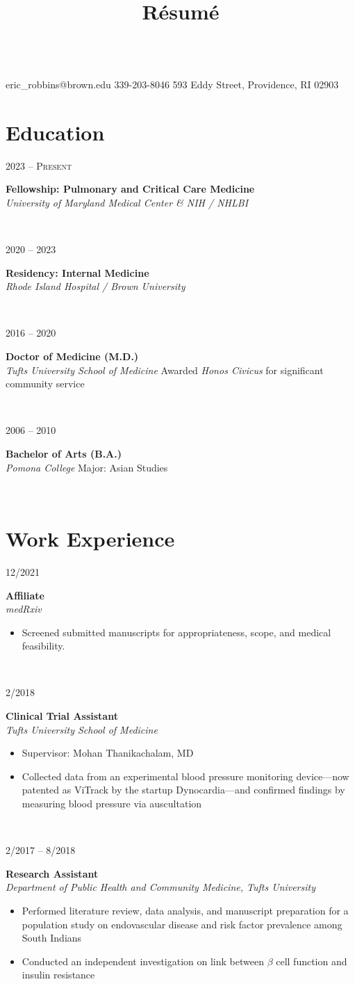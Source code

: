 \documentclass{book}
\title{R\'esum\'e}
\author{\me}
\date{}
\makeatletter
\newcommand\colleft{.20}
\newcommand\colright{.75}
\newcommand\mohan{Mohan Thanikachalam, MD}
\newcommand{\entryfour}[4]
	{
		\begin{minipage}[t]{\colleft\textwidth}
		\hfill \textsc{#1}
		\end{minipage}
		\hfill\vline\hfill
		\begin{minipage}[t]{\colright\textwidth}
		{\bf#2}\\
		\textit{#3}
		\footnotesize{#4}
		\end{minipage}\\
		\entryvspace
	}%
\newcommand{\entryvspace}{\vspace{0.5em}}
\newcommand{\fellowship}{University of Maryland Medical Center \& NIH / NHLBI}
\newcommand{\residency}{Rhode Island Hospital / Brown University}
\newcommand{\medschool}{Tufts University School of Medicine}
\newcommand{\undergrad}{Pomona College}
\newcommand{\cphone}{339-203-8046}
\newcommand{\address}{593 Eddy Street, Providence, RI 02903}
\newcommand{\email}{eric\_robbins@brown.edu}
\renewcommand{\maketitle}{
\begin{center}
	{\huge\bfseries\theauthor}
	\vspace{0.25em}\\
	\email
	\hspace{1em}\vline \hspace{1em}%
	\cphone
	\hspace{1em}\vline \hspace{1em}
	\address
\end{center}
}
\makeatother
\begin{document}
	\maketitle
	\section*{Education}
		\entryfour{2023 -- Present}
			{Fellowship: Pulmonary and Critical Care Medicine}
			{\fellowship}
			{}
			
		\entryfour{2020 -- 2023}
			{Residency: Internal Medicine}
			{\residency}
			{}
			
		\entryfour{2016 -- 2020}
			{Doctor of Medicine (M.D.)}
			{\medschool}
			{Awarded \textit{Honos Civicus} for significant community service}
			
		\entryfour{2006 -- 2010}
		{Bachelor of Arts (B.A.)}
		{\undergrad}
		{Major: Asian Studies}
	\section*{Work Experience}
		\entryfour{12/2021}{Affiliate}{medRxiv}{%
			\begin{itemize}
				\item Screened submitted manuscripts for appropriateness, scope, and medical feasibility.
			\end{itemize}
			}

		\entryfour{2/2018}{Clinical Trial Assistant}{\medschool}{%
		 \begin{itemize}
		 	\item Supervisor: \mohan
		 	\item Collected data from an experimental blood pressure monitoring device—now patented as ViTrack by the startup Dynocardia—and confirmed findings by measuring blood pressure via auscultation
		 \end{itemize}
	 	}
		
		\entryfour{2/2017 -- 8/2018}{Research Assistant}{Department of Public Health and Community Medicine, Tufts University}{%
		\begin{itemize}
			\item Performed literature review, data analysis, and manuscript preparation for a population study on endovascular disease and risk factor prevalence among South Indians
			\item Conducted an independent investigation on link between $\beta$ cell function and insulin resistance
		\end{itemize}
	}
\end{document}
